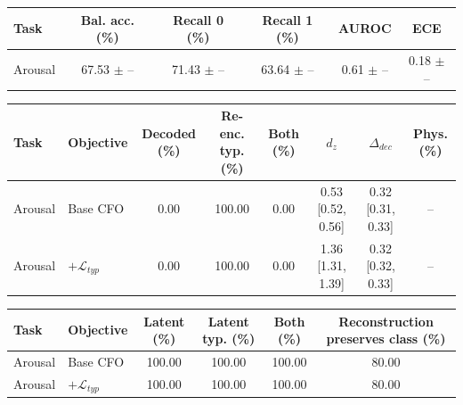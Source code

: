 \begin{tabular}{lccccc}
Task & Bal. acc. (\%) & Recall 0 (\%) & Recall 1 (\%) & AUROC & ECE \\ \hline
Arousal & 67.53 $\pm$ -- & 71.43 $\pm$ -- & 63.64 $\pm$ -- & 0.61 $\pm$ -- & 0.18 $\pm$ -- \\
\end{tabular}

\begin{tabular}{llcccccc}
Task & Objective & Decoded (\%) & Re-enc. typ. (\%) & Both (\%) & $d_z$ & $\Delta_{dec}$ & Phys. (\%) \\ \hline
Arousal & Base CFO & 0.00 & 100.00 & 0.00 & 0.53 [0.52, 0.56] & 0.32 [0.31, 0.33] & -- \\
Arousal & $+\mathcal{L}_{typ}$ & 0.00 & 100.00 & 0.00 & 1.36 [1.31, 1.39] & 0.32 [0.32, 0.33] & -- \\
\end{tabular}

\begin{tabular}{llcccc}
Task & Objective & Latent (\%) & Latent typ. (\%) & Both (\%) & Reconstruction preserves class (\%) \\ \hline
Arousal & Base CFO & 100.00 & 100.00 & 100.00 & 80.00 \\
Arousal & $+\mathcal{L}_{typ}$ & 100.00 & 100.00 & 100.00 & 80.00 \\
\end{tabular}
